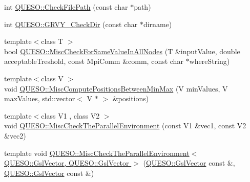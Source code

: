 \begin{DoxyCompactItemize}
\item 
int \hyperlink{namespace_q_u_e_s_o_abc55c11f68bb99c4eba88030f1164764}{Q\-U\-E\-S\-O\-::\-Check\-File\-Path} (const char $\ast$path)
\item 
int \hyperlink{namespace_q_u_e_s_o_a56d7533d2177cf02d3fd761f7a22a873}{Q\-U\-E\-S\-O\-::\-G\-R\-V\-Y\-\_\-\-Check\-Dir} (const char $\ast$dirname)
\item 
{\footnotesize template$<$class T $>$ }\\bool \hyperlink{namespace_q_u_e_s_o_a4166a375c5adbea35afaaf20775bc519}{Q\-U\-E\-S\-O\-::\-Misc\-Check\-For\-Same\-Value\-In\-All\-Nodes} (T \&input\-Value, double acceptable\-Treshold, const Mpi\-Comm \&comm, const char $\ast$where\-String)
\item 
{\footnotesize template$<$class V $>$ }\\void \hyperlink{namespace_q_u_e_s_o_a3a6b46538ead03c47f13e60542608e34}{Q\-U\-E\-S\-O\-::\-Misc\-Compute\-Positions\-Between\-Min\-Max} (V min\-Values, V max\-Values, std\-::vector$<$ V $\ast$ $>$ \&positions)
\item 
{\footnotesize template$<$class V1 , class V2 $>$ }\\void \hyperlink{namespace_q_u_e_s_o_a57ad15be98b39ff64e0719305c639c75}{Q\-U\-E\-S\-O\-::\-Misc\-Check\-The\-Parallel\-Environment} (const V1 \&vec1, const V2 \&vec2)
\item 
template void \hyperlink{_miscellaneous_8_c_a1d4ad7eb410db249c0143600c82d07ce}{Q\-U\-E\-S\-O\-::\-Misc\-Check\-The\-Parallel\-Environment$<$ Q\-U\-E\-S\-O\-::\-Gsl\-Vector, Q\-U\-E\-S\-O\-::\-Gsl\-Vector $>$} (\hyperlink{class_q_u_e_s_o_1_1_gsl_vector}{Q\-U\-E\-S\-O\-::\-Gsl\-Vector} const \&, \hyperlink{class_q_u_e_s_o_1_1_gsl_vector}{Q\-U\-E\-S\-O\-::\-Gsl\-Vector} const \&)
\end{DoxyCompactItemize}


